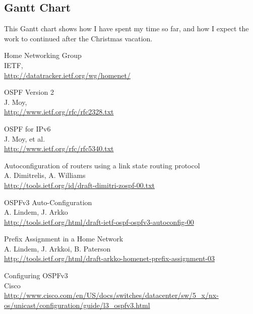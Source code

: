 \documentclass[12pt]{report}
\begin{document}
\pagebreak

\begin{landscape}

\section{Gantt Chart}
This Gantt chart shows how I have spent my time so far, and how I expect the
work to continued after the Christmas vacation.
\end{landscape}

\pagebreak

\printnomenclature

\pagebreak


\begin{thebibliography}{9}


	Home Networking Group \\
	IETF,\\
	\url{http://datatracker.ietf.org/wg/homenet/}

	OSPF Version 2 \\
	J. Moy,\\
	\url{http://www.ietf.org/rfc/rfc2328.txt}

	OSPF for IPv6 \\
	J. Moy, et al.\\
	\url{http://www.ietf.org/rfc/rfc5340.txt}

	Autoconfiguration of routers using a link state routing protocol \\
	A. Dimitrelis, A. Williams\\
	\url{http://tools.ietf.org/id/draft-dimitri-zospf-00.txt}

	OSPFv3 Auto-Configuration \\
	A. Lindem, J. Arkko\\
	\url{http://tools.ietf.org/html/draft-ietf-ospf-ospfv3-autoconfig-00}

	Prefix Assignment in a Home Network \\
	A. Lindem, J. Arkkoi, B. Paterson\\
	\url{http://tools.ietf.org/html/draft-arkko-homenet-prefix-assignment-03}

	Configuring OSPFv3 \\
	Cisco\\
	\url{http://www.cisco.com/en/US/docs/switches/datacenter/sw/5\_x/nx-os/unicast/configuration/guide/l3\_ospfv3.html}


\end{thebibliography}
\end{document}
